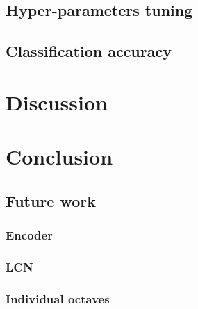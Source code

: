 \documentclass[a4paper,12pt,twoside]{report}
\begin{document}
\section{Hyper-parameters tuning}

\section{Classification accuracy}

\chapter{Discussion}
\label{discussion}

\chapter*{Conclusion}
\label{conclusion}

\section*{Future work}

\subsection*{Encoder}

\subsection*{LCN}

\subsection*{Individual octaves}
\end{document}
